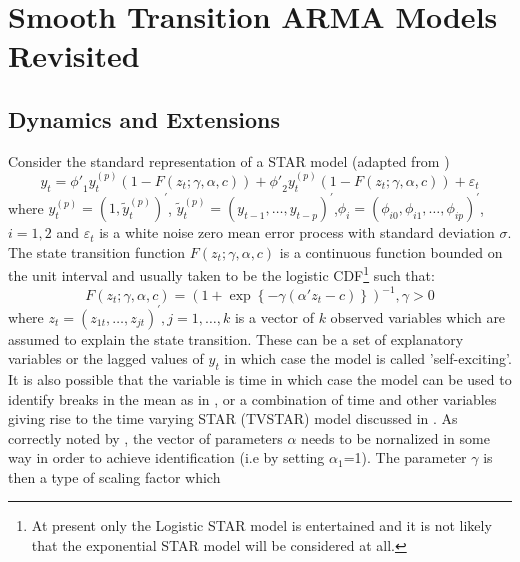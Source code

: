 \section{Smooth Transition ARMA Models Revisited}\label{sec:1}
\subsection{Dynamics and Extensions}
Consider the standard representation of a STAR model (adapted from
\cite{Dijk1999})
\begin{equation}\label{eq:star_original}
{y_t} = {{\phi '}_1}y_t^{\left( p \right)}\left( {1 - F\left( {{z_t};\gamma
,\alpha ,c} \right)} \right) + {{\phi '}_2}y_t^{\left( p \right)}\left( {1 - F\left( {{z_t};\gamma ,\alpha ,c} \right)} \right) + {\varepsilon _t}
\end{equation}
where $y_t^{\left( p \right)} = {\left( {1,\tilde y_t^{\left( p
\right)}}\right)^\prime }$, $\tilde y_t^{\left( p \right)} = {\left(
{{y_{t-1}},\dots,{y_{t - p}}} \right)^\prime }$,${\phi _i} = {\left( {{\phi
_{i0}},{\phi _{i1}},\dots,{\phi _{ip}}} \right)^\prime }$, $i = 1,2$ and
$\varepsilon_t$ is a white noise zero mean error process with standard deviation
$\sigma$. The state transition function $F\left( {{z_t};\gamma ,\alpha ,c} \right)$ 
is a continuous function bounded on the unit interval and usually taken to be
the logistic CDF\footnote{At present only the Logistic STAR model is
entertained and it is not likely that the exponential STAR model will be
considered at all.} such that:
\begin{equation}\label{eq:logistic_cdf}
F\left( {{z_t};\gamma ,\alpha ,c} \right) = {\left( {1 + \exp \left\{ { -
\gamma \left( {\alpha '{z_t} - c} \right)} \right\}} \right)^{ - 1}},\gamma  > 0
\end{equation}
where ${z_t} = {\left( {{z_{1t}},\dots,{z_{jt}}} \right)^\prime },j = 1,\dots,k$
is a vector of $k$ observed variables which are assumed to explain the state
transition. These can be a set of explanatory variables or the lagged values of $y_t$ in which case
the model is called 'self-exciting'. It is also possible that the variable is
time in which case the model can be used to identify breaks in the mean as in 
\cite{Lin1994}, or a combination of time and other variables giving rise to the
time varying STAR (TVSTAR) model discussed in \cite{Lundbergh2003}. As correctly 
noted by \cite{Dijk1999}, the vector of parameters $\alpha$ needs to be
nornalized in some way in order to achieve identification (i.e by setting
$\alpha_1$=1). The parameter $\gamma$ is then a type of scaling factor which
